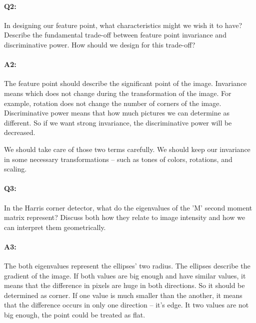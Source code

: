 
\pagebreak
\paragraph{Q2:} In designing our feature point, what characteristics might we wish it to have? Describe the fundamental trade-off between feature point invariance and discriminative power. How should we design for this trade-off?

\paragraph{A2:} The feature point should describe the significant point of the image. Invariance means which does not change during the transformation of the image. For example, rotation does not change the number of corners of the image.
Discriminative power means that how much pictures we can determine as different. So if we want strong invariance, the discriminative power will be decreased.

We should take care of those two terms carefully. We should keep our invariance in some necessary transformations -- such as tones of colors, rotations, and scaling.




\pagebreak
\paragraph{Q3:} In the Harris corner detector, what do the eigenvalues of the 'M' second moment matrix represent? Discuss both how they relate to image intensity and how we can interpret them geometrically.

\paragraph{A3:} The both eigenvalues represent the ellipses' two radius. The ellipses describe the gradient of the image.
If both values are big enough and have similar values, it means that the difference in pixels are huge in both directions. So it should be determined as corner.
If one value is much smaller than the another, it means that the difference occurs in only one direction -- it's edge.
It two values are not big enough, the point could be treated as flat.



